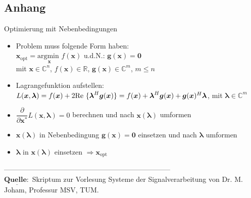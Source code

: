 \documentclass[a4paper,landscape,6pt]{article}
\newcommand{\ma}[1]{\ensuremath{\boldsymbol {#1}}}								%
\renewcommand{\vec}[1]{\ensuremath{\boldsymbol {#1}}}							%
\begin{document}
\begin{multicols}{3}
\section{Anhang}
\begin{cookbox}{Optimierung mit Nebenbedingungen}
	\begin{itemize}
		\item[1)] Problem muss folgende Form haben:\\
		$\vec x_{\text{opt}} = \underset{\vec x}{\text{argmin }}f(\vec x) $ u.d.N.: $\vec g(\vec x) = \vec 0$\\
		mit $\vec x \in \mathbb{C}^n$, $f(\vec x) \in \mathbb{R}$, $\vec g (\vec x) \in \mathbb{C}^m$, $m\le n$
		\item[2)] Lagrangefunktion aufstellen:\\ $L(\vec x, \vec \lambda) = f(\vec x) + 2 \text{Re }\{\vec \lambda^H \vec g(\vec x)\}\\ = f(\vec x) + \vec \lambda^H \vec g(\vec x) + \vec g(\vec x)^H\vec \lambda$, mit $\vec \lambda \in \mathbb{C}^m$
		\item[3)] $\dfrac{\partial}{\partial \vec x^*} L(\vec x, \vec \lambda) = 0$ berechnen und nach $\vec x(\vec \lambda)$ umformen
		\item[4)] $\vec x(\vec \lambda)$ in Nebenbedingung  $\vec g(\vec x) = \vec 0$ einsetzen und nach $\vec \lambda$ umformen
		\item[5)] $\vec \lambda$ in $\vec x(\vec \lambda)$ einsetzen $\Rightarrow \vec x_{\text{opt}}$
	\end{itemize}
\end{cookbox}
-----------------------------------------------------------------------\\
\ma{\underline{Quelle:}} Skriptum zur Vorlesung Systeme der Signalverarbeitung von Dr. M. Joham, Professur MSV, TUM.
\newpage
\end{multicols}
\end{document}
